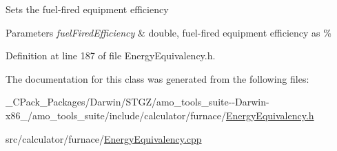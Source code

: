 Sets the fuel-\/fired equipment efficiency


\begin{DoxyParams}{Parameters}
{\em fuel\+Fired\+Efficiency} & double, fuel-\/fired equipment efficiency as \% \\
\hline
\end{DoxyParams}


Definition at line 187 of file Energy\+Equivalency.\+h.



The documentation for this class was generated from the following files\+:\begin{DoxyCompactItemize}
\item 
\+\_\+\+C\+Pack\+\_\+\+Packages/\+Darwin/\+S\+T\+G\+Z/amo\+\_\+tools\+\_\+suite-\/-\/\+Darwin-\/x86\+\_/amo\+\_\+tools\+\_\+suite/include/calculator/furnace/\hyperlink{___c_pack___packages_2_darwin_2_s_t_g_z_2amo__tools__suite--_darwin-x86__64_2amo__tools__suite_22deb35937168994abc5651756c82123a}{Energy\+Equivalency.\+h}\item 
src/calculator/furnace/\hyperlink{_energy_equivalency_8cpp}{Energy\+Equivalency.\+cpp}\end{DoxyCompactItemize}
